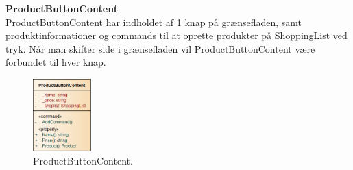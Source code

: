 \textbf{ProductButtonContent} \\
ProductButtonContent har indholdet af 1 knap på grænsefladen, samt produktinformationer og commands til at oprette produkter på ShoppingList ved tryk. Når man skifter side i grænsefladen vil ProductButtonContent være forbundet til hver knap.

\begin{figure}[H]
	\centering
	\includegraphics[width=0.2\textwidth]{Systemdesign/Frontend/pics/ProductButtonContent}
	\caption{ProductButtonContent.}
	\label{fig:PBCon}
\end{figure}